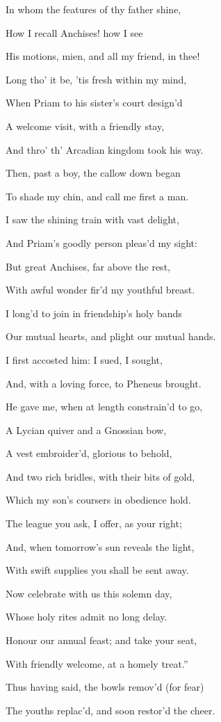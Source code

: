 In whom the features of thy father shine,

How I recall Anchises! how I see

His motions, mien, and all my friend, in thee!

Long tho’ it be, ’tis fresh within my mind,

When Priam to his sister’s court design’d

A welcome visit, with a friendly stay,

And thro’ th’ Arcadian kingdom took his way.

Then, past a boy, the callow down began

To shade my chin, and call me first a man.

I saw the shining train with vast delight,

And Priam’s goodly person pleas’d my sight:

But great Anchises, far above the rest,

With awful wonder fir’d my youthful breast.

I long’d to join in friendship’s holy bands

Our mutual hearts, and plight our mutual hands.

I first accosted him: I sued, I sought,

And, with a loving force, to Pheneus brought.

He gave me, when at length constrain’d to go,

A Lycian quiver and a Gnossian bow,

A vest embroider’d, glorious to behold,

And two rich bridles, with their bits of gold,

Which my son’s coursers in obedience hold.

The league you ask, I offer, as your right;

And, when tomorrow’s sun reveals the light,

With swift supplies you shall be sent away.

Now celebrate with us this solemn day,

Whose holy rites admit no long delay.

Honour our annual feast; and take your seat,

With friendly welcome, at a homely treat.”

Thus having said, the bowls remov’d (for fear)

The youths replac’d, and soon restor’d the cheer.

